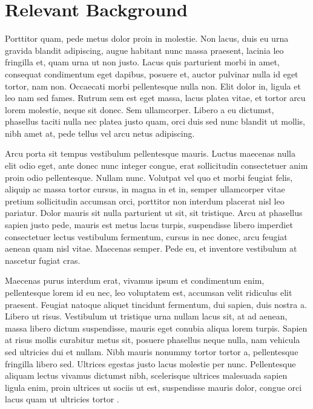 \section*{Relevant Background}

\begin{singlespace}
\im
Porttitor quam, pede metus dolor proin in molestie.
Non lacus, duis eu urna gravida blandit adipiscing, augue habitant nunc massa praesent, lacinia leo fringilla et, quam urna ut non justo.
Lacus quis parturient morbi in amet, consequat condimentum eget dapibus, posuere et, auctor pulvinar nulla id eget tortor, nam non.
Occaecati morbi pellentesque nulla non.
Elit dolor in, ligula et leo nam sed fames.
Rutrum sem est eget massa, lacus platea vitae, et tortor arcu lorem molestie, neque sit donec.
Sem ullamcorper.
\bi
Libero a eu dictumst, phasellus taciti nulla nec platea justo quam, orci duis sed nunc blandit ut mollis, nibh amet at, pede tellus vel arcu netus adipiscing.
\end{singlespace}

\begin{singlespace}
\im
Arcu porta sit tempus vestibulum pellentesque mauris.
Luctus maecenas nulla elit odio eget, ante donec nunc integer congue, erat sollicitudin consectetuer anim proin odio pellentesque.
Nullam nunc.
Volutpat vel quo et morbi feugiat felis, aliquip ac massa tortor cursus, in magna in et in, semper ullamcorper vitae pretium sollicitudin accumsan orci, porttitor non interdum placerat nisl leo pariatur.
Dolor mauris sit nulla parturient ut sit, sit tristique.
Arcu at phasellus sapien justo pede, mauris est metus lacus turpis, suspendisse libero imperdiet consectetuer lectus vestibulum fermentum, cursus in nec donec, arcu feugiat aenean quam nisl vitae.
Maecenas semper.
Pede eu, et inventore vestibulum at nascetur fugiat cras.
\end{singlespace}

\begin{singlespace}
\im
Maecenas purus interdum erat, vivamus ipsum et condimentum enim, pellentesque lorem id eu nec, leo voluptatem est, accumsan velit ridiculus elit praesent.
Feugiat natoque aliquet tincidunt fermentum, dui sapien, duis nostra a.
Libero ut risus.
Vestibulum ut tristique urna nullam lacus sit, at ad aenean, massa libero dictum suspendisse, mauris eget conubia aliqua lorem turpis.
Sapien at risus mollis curabitur metus sit, posuere phasellus neque nulla, nam vehicula sed ultricies dui et nullam.
Nibh mauris nonummy tortor tortor a, pellentesque fringilla libero sed.
Ultrices egestas justo lacus molestie per nunc.
\bi
Pellentesque aliquam lectus vivamus dictumst nibh, scelerisque ultrices malesuada sapien ligula enim, proin ultrices ut sociis ut est, suspendisse mauris dolor, congue orci lacus quam ut ultricies tortor \cite{watson1953}.
\end{singlespace}

